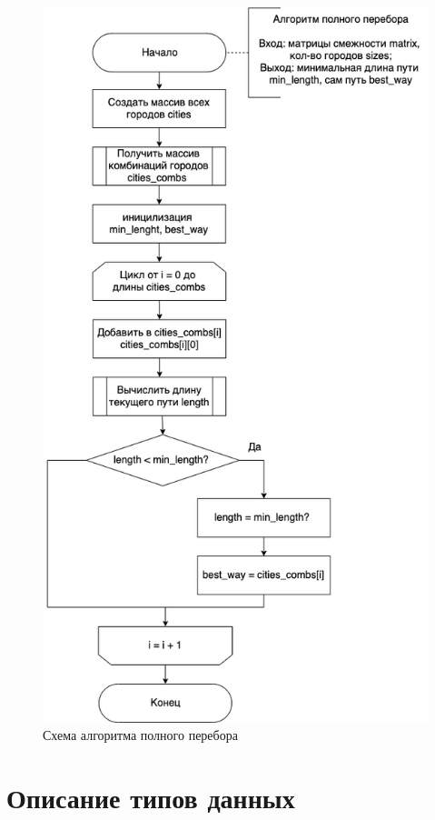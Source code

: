 \clearpage

\begin{figure}[h]
	\centering
	\includegraphics[scale=0.6]{img/full_comb_alg_scheme.png}
	\caption{Схема алгоритма полного перебора}
	\label{fig:full_comb_alg_scheme}
\end{figure}

\section{Описание типов данных}

